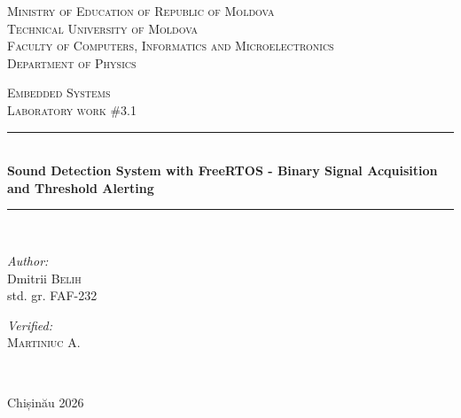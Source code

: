 \documentclass[12pt]{article}
\begin{document}
\begin{titlepage}
	\thispagestyle{empty}
	
	\begin{center}
		\textsc{\large Ministry of Education of Republic of Moldova}\\[0.5cm]
		\textsc{\large Technical University of Moldova}\\[0.5cm]
		\textsc{\large Faculty of Computers, Informatics and Microelectronics}\\[0.5cm]
		\textsc{\large Department of Physics}\\[1.2cm]
	\end{center}

	\vspace{25 mm}

	\begin{center}
		\textsc{\Large Embedded Systems}\\[0.5cm]
		\textsc{\large Laboratory work \#3.1}\\[0.5cm]

		\newcommand{\HRule}{\rule{\linewidth}{0.5mm}}
		\vspace{10 mm}
		\HRule \\[0.4cm]
		{ \LARGE \bfseries Sound Detection System with FreeRTOS - Binary Signal Acquisition and Threshold Alerting}\\[0.4cm]
		\HRule \\[1.5cm]
	\end{center}

	\vspace{10mm}

	\begin{minipage}[t]{0.4\textwidth}
		\begin{flushleft} \large
			\emph{Author:} \\
			Dmitrii \textsc{Belih}\\
			std. gr. FAF-232
		\end{flushleft}
	\end{minipage}
	\hfill
	\begin{minipage}[t]{0.4\textwidth}
		\begin{flushright} \large
			\emph{Verified:} \\
			\textsc{Martiniuc} A.\\
		\end{flushright}
	\end{minipage}\\[3cm]

	\vspace{5 mm}
	\begin{center}
		\large Chișinău 2026\\[0.5cm]
	\end{center}

	\vfill
\end{titlepage}
\end{document}
